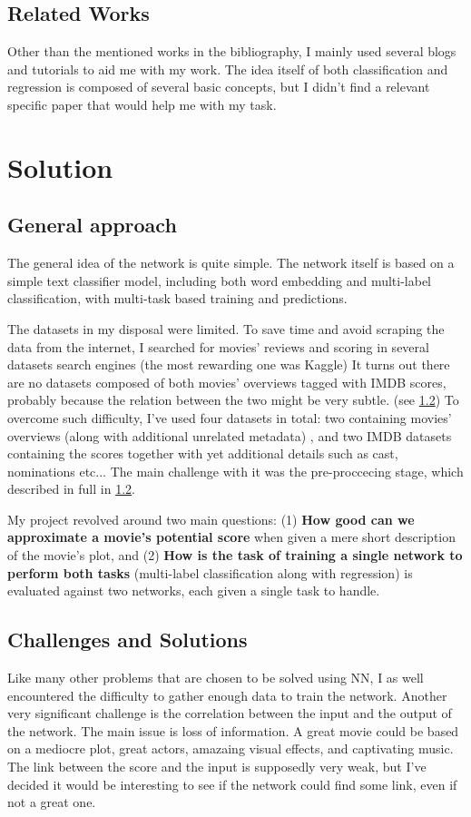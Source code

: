 \documentclass[11pt]{article}
\begin{document}
\subsection{Related Works}
Other than the mentioned works in the bibliography, I mainly used several blogs and tutorials to aid me with my work.
The idea itself of both classification and regression is composed of several basic concepts, but I didn't find a relevant specific paper that would help me with my task.

\section{Solution}
\subsection{General approach}
The general idea of the network is quite simple.
The network itself is based on a simple text classifier model, including both word embedding and multi-label classification, with multi-task based training and predictions.

The datasets in my disposal were limited. To save time and avoid scraping the data from the internet, I searched for movies' reviews and scoring in several datasets search engines (the most rewarding one was Kaggle)
It turns out there are no datasets composed of both movies' overviews tagged with IMDB scores, probably because the relation between the two might be very subtle. (see \ref{challenges})
To overcome such difficulty, I've used four datasets in total: two containing movies' overviews (along with additional unrelated metadata) \citep{kaggle:wiki,kaggle:movies}, and two IMDB datasets containing the scores together with yet additional details such as cast, nominations etc... \citep{kaggle:imdb,kaggle:imdb5000}
The main challenge with it was the pre-proccecing stage, which described in full in \ref{challenges}.

My project revolved around two main questions: (1) \textbf{How good can we approximate a movie's potential score} when given a mere short description of the movie's plot, and 
(2) \textbf{How is the task of training a single network to perform both tasks} (multi-label classification along with regression) is evaluated against two networks, each given a single task to handle.

\subsection{Challenges and Solutions}\label{challenges}
Like many other problems that are chosen to be solved using NN, I as well encountered the difficulty to gather enough data to train the network.
Another very significant challenge is the correlation between the input and the output of the network.
The main issue is loss of information. A great movie could be based on a mediocre plot, great actors, amazaing visual effects, and captivating music.
The link between the score and the input is supposedly very weak, but I've decided it would be interesting to see if the network could find some link, even if not a great one.
\end{document}
